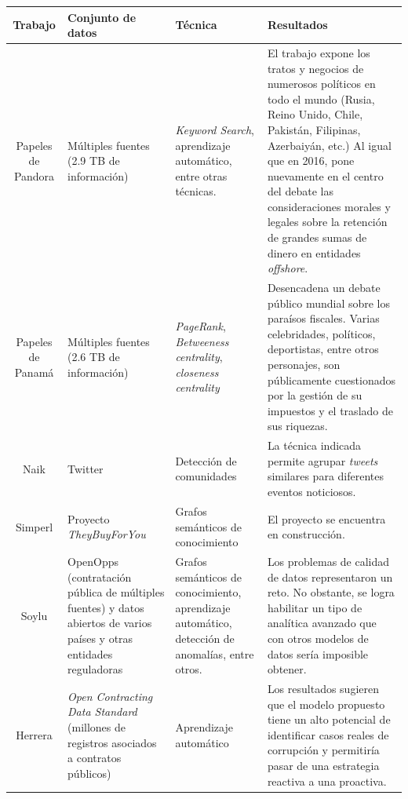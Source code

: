 \documentclass[11pt,letterpaper,oneside]{article}
\begin{document}
	\begin{table}[!b]
	\begin{center}
		\centering
		\small
		
		\begin{tabular}{ |c|p{3cm}|p{3cm}|p{5cm}| }
			\hline
			\textbf{Trabajo} 
			& \textbf{Conjunto de datos}
			& \textbf{Técnica}
			& \textbf{Resultados}
			\\ \hline
			
			Papeles de Pandora 
			& Múltiples fuentes (2.9 TB de información) 
			& \textit{Keyword Search}, aprendizaje automático,
			entre otras técnicas. 
			& El trabajo expone los tratos y negocios de 
			numerosos políticos en todo el mundo (Rusia, Reino 
			Unido, Chile, Pakistán, Filipinas, Azerbaiyán, etc.)
			Al igual que en 2016, pone nuevamente en el centro 
			del debate las consideraciones morales y legales 
			sobre la retención de grandes sumas de dinero en 
			entidades \textit{offshore}. \\ \hline
			
			Papeles de Panamá & Múltiples fuentes (2.6 TB de información) & \textit{PageRank}, \textit{Betweeness centrality}, \textit{closeness centrality} & Desencadena un debate público mundial sobre los paraísos fiscales. Varias celebridades, políticos, deportistas, entre otros personajes, son públicamente cuestionados por la gestión de su impuestos y el traslado de sus riquezas. \\ \hline
			
			Naik & Twitter & Detección de comunidades & La técnica indicada permite agrupar \textit{tweets} similares para diferentes eventos noticiosos. \\ \hline
			
			Simperl & Proyecto \textit{TheyBuyForYou} & Grafos semánticos de conocimiento & El proyecto se encuentra en construcción.\\ \hline
			
			Soylu & OpenOpps (contratación pública de múltiples fuentes) y datos abiertos de varios países y otras entidades reguladoras  & Grafos semánticos de conocimiento, aprendizaje automático, detección de anomalías, entre otros. & Los problemas de calidad de datos representaron un reto. No obstante, se logra habilitar un tipo de analítica avanzado que con otros modelos de datos sería imposible obtener. \\ \hline
			
			Herrera & \textit{Open Contracting Data Standard} (millones de registros asociados a contratos públicos) & Aprendizaje automático & Los resultados sugieren que el modelo propuesto tiene un alto potencial de identificar casos reales de corrupción y permitiría pasar de una estrategia reactiva a una proactiva. \\ \hline
			

\end{tabular}
\end{center}
\end{table}
\end{document}
